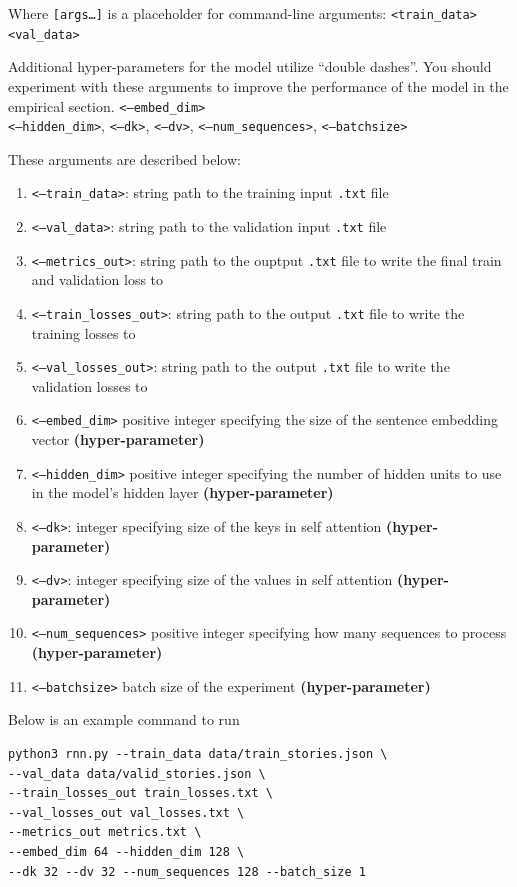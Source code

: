 \documentclass[11pt,addpoints,answers]{exam}
\begin{document}
Where \texttt{[args\dots]} is a placeholder for command-line arguments: \texttt{<train\_data>} \texttt{<val\_data>}

Additional hyper-parameters for the model utilize ``double dashes''. You should experiment with these arguments to improve the performance of the model in the empirical section. \texttt{<--embed\_dim>} \\ \texttt{<--hidden\_dim>}, \texttt{<--dk>}, \texttt{<--dv>}, \texttt{<--num\_sequences>}, \texttt{<--batch\textunderscore size>}

These arguments are described below:
\begin{enumerate}
    \item \texttt{<--train\_data>}: string path to the training input \texttt{.txt} file 
    \item \texttt{<--val\_data>}: string path to the validation input \texttt{.txt} file 
    \item \texttt{<--metrics\_out>}: string path to the ouptput \texttt{.txt} file to write the final train and validation loss to
    \item \texttt{<--train\_losses\_out>}: string path to the output \texttt{.txt} file to write the training losses to
    \item \texttt{<--val\_losses\_out>}: string path to the output \texttt{.txt} file to write the validation losses to
     \item \texttt{<--embed\_dim>} positive integer specifying the size of the sentence embedding vector \textbf{(hyper-parameter)}
    \item \texttt{<--hidden\_dim>} positive integer specifying the number of hidden units to use in the model's hidden layer \textbf{(hyper-parameter)}
    \item \texttt{<--dk>}: integer specifying size of the keys in self attention \textbf{(hyper-parameter)}
    \item \texttt{<--dv>}: integer specifying size of the values in self attention \textbf{(hyper-parameter)}
    \item \texttt{<--num\_sequences>} positive integer specifying how many sequences to process \textbf{(hyper-parameter)}
    \item \texttt{<--batch\textunderscore size>} batch size of the experiment \textbf{(hyper-parameter)}
\end{enumerate}

Below is an example command to run

\begin{lstlisting}
python3 rnn.py --train_data data/train_stories.json \
--val_data data/valid_stories.json \
--train_losses_out train_losses.txt \ 
--val_losses_out val_losses.txt \
--metrics_out metrics.txt \
--embed_dim 64 --hidden_dim 128 \
--dk 32 --dv 32 --num_sequences 128 --batch_size 1 
\end{lstlisting}
\vspace{0.2 in}
\end{document}
